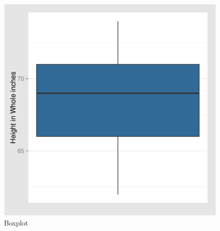 \documentclass[nohyper,justified]{tufte-handout}\usepackage[]{graphicx}\usepackage[]{color}
\makeatletter
\def\maxwidth{ %
  \ifdim\Gin@nat@width>\linewidth
    \linewidth
  \else
    \Gin@nat@width
  \fi
}
\newenvironment{knitrout}{}{} %
\makeatother
\begin{document}
\begin{knitrout}
\color{fgcolor}\begin{figure}[h!]

{\centering \includegraphics[width=\maxwidth]{figure/graphics-boxplot-1} 

}

\caption[Boxplot]{Boxplot}\label{fig:boxplot}
\end{figure}


\end{knitrout}
\end{document}
